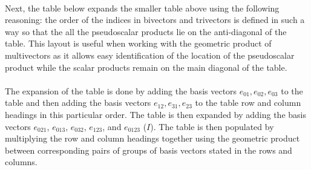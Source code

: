 \documentclass{article}
\begin{document}
\begin{enumerate}
    \paragraph{}
        Next, the table below expands the smaller table above using the following reasoning: the order of the indices in bivectors and trivectors
        is defined in such a way so that the all the pseudoscalar products lie on the anti-diagonal of the table. This layout is
        useful when working with the geometric product of multivectors as it allows easy identification of the location of the pseudoscalar
        product while the scalar products remain on the main diagonal of the table.
    \paragraph{}
        The expansion of the table is done by adding the basis vectors $e_{01}, e_{02}, e_{03}$ to the table and then adding the
        basis vectors $e_{12}, e_{31}, e_{23}$ to the table row and column headings in this particular order.
        The table is then expanded by adding the basis vectors $e_{021}$, $e_{013}$, $e_{032}$, $e_{123}$, and 
        $e_{0123}$ ($I$). The table is then populated by multiplying the row and column
        headings together using the geometric product between corresponding pairs of groups of basis vectors stated in 
        the rows and columns.

\end{enumerate}



    
\end{document}
